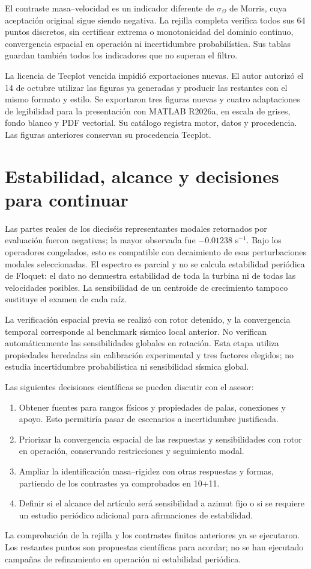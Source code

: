 El contraste masa--velocidad es un indicador diferente de $\sigma_\Omega$ de Morris, cuya aceptación original sigue siendo negativa. La rejilla completa verifica todos sus 64 puntos discretos, sin certificar extrema o monotonicidad del dominio continuo, convergencia espacial en operación ni incertidumbre probabilística. Sus tablas guardan también todos los indicadores que no superan el filtro.

La licencia de Tecplot vencida impidió exportaciones nuevas. El autor autorizó el 14 de octubre utilizar las figuras ya generadas y producir las restantes con el mismo formato y estilo. Se exportaron tres figuras nuevas y cuatro adaptaciones de legibilidad para la presentación con MATLAB R2026a, en escala de grises, fondo blanco y PDF vectorial. Su catálogo registra motor, datos y procedencia. Las figuras anteriores conservan su procedencia Tecplot.

\section{Estabilidad, alcance y decisiones para continuar}
Las partes reales de los dieciséis representantes modales retornados por evaluación fueron negativas; la mayor observada fue $-0.01238$ s$^{-1}$. Bajo los operadores congelados, esto es compatible con decaimiento de esas perturbaciones modales seleccionadas. El espectro es parcial y no se calcula estabilidad periódica de Floquet: el dato no demuestra estabilidad de toda la turbina ni de todas las velocidades posibles. La sensibilidad de un centroide de crecimiento tampoco sustituye el examen de cada raíz.

La verificación espacial previa se realizó con rotor detenido, y la convergencia temporal corresponde al benchmark sísmico local anterior. No verifican automáticamente las sensibilidades globales en rotación. Esta etapa utiliza propiedades heredadas sin calibración experimental y tres factores elegidos; no estudia incertidumbre probabilística ni sensibilidad sísmica global.

Las siguientes decisiones científicas se pueden discutir con el asesor:
\begin{enumerate}
\item Obtener fuentes para rangos físicos y propiedades de palas, conexiones y apoyo. Esto permitiría pasar de escenarios a incertidumbre justificada.
\item Priorizar la convergencia espacial de las respuestas y sensibilidades con rotor en operación, conservando restricciones y seguimiento modal.
\item Ampliar la identificación masa--rigidez con otras respuestas y formas, partiendo de los contrastes ya comprobados en 10+11.
\item Definir si el alcance del artículo será sensibilidad a azimut fijo o si se requiere un estudio periódico adicional para afirmaciones de estabilidad.
\end{enumerate}
La comprobación de la rejilla y los contrastes finitos anteriores ya se ejecutaron. Los restantes puntos son propuestas científicas para acordar; no se han ejecutado campañas de refinamiento en operación ni estabilidad periódica.

